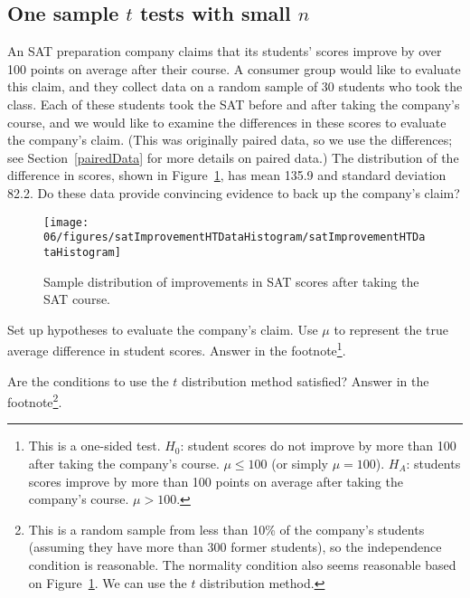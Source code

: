 \subsection{One sample $t$ tests with small $n$}

An SAT preparation company claims that its students' scores improve by over 100 points on average after their course. A consumer group would like to evaluate this claim, and they collect data on a random sample of 30 students who took the class. Each of these students took the SAT before and after taking the company's course, and we would like to examine the differences in these scores to evaluate the company's claim. (This was originally paired data, so we use the differences; see Section~\ref{pairedData} for more details on paired data.)
 The distribution of the difference in scores, shown in Figure~\ref{satImprovementHTDataHistogram}, has mean 135.9 and standard deviation 82.2. Do these data provide convincing evidence to back up the company's claim? 
\begin{figure}
\centering
\texttt{[image: 06/figures/satImprovementHTDataHistogram/satImprovementHTDataHistogram]}
\caption{Sample distribution of improvements in SAT scores after taking the SAT course.}
\label{satImprovementHTDataHistogram}
\end{figure}

\begin{exercise}
Set up hypotheses to evaluate the company's claim. Use $\mu$ to represent the true average difference in student scores. Answer in the footnote\footnote{This is a one-sided test. $H_0$: student scores do not improve by more than 100 after taking the company's course. $\mu \leq 100$ (or simply $\mu = 100$). $H_A$: students scores improve by more than 100 points on average after taking the company's course. $\mu > 100$.}.
\end{exercise}

\begin{exercise}
Are the conditions to use the $t$ distribution method satisfied? Answer in the footnote\footnote{This is a random sample from less than 10\% of the company's students (assuming they have more than 300 former students), so the independence condition is reasonable. The normality condition also seems reasonable based on Figure~\ref{satImprovementHTDataHistogram}. We can use the $t$ distribution method.}.
\end{exercise}

